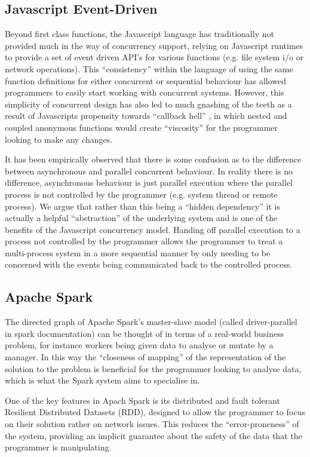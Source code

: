 \documentclass{sig-alternate}
\begin{document}
\subsection{Javascript Event-Driven}
Beyond first class functions, the Javascript language has
traditionally not provided much in the way of concurrency support,
relying on Javascript runtimes to provide a set of event driven API's
for various functions (e.g. file system i/o or network operations).
This ``consistency'' within the language of using the same function
definitions for either concurrent or sequential behaviour has allowed
programmers to easily start working with concurrent systems. However,
this simplicity of concurrent design has also led to much gnashing of
the teeth as a result of Javascripts propensity towards ``callback
hell'' \cite{Edwards:2009:CR:1639950.1640058}, in which nested and
coupled anonymous functions would create ``viscosity'' for the
programmer looking to make any changes.

It has been empirically observed that there is some confusion as to
the difference between asynchronous and parallel concurrent behaviour.
In reality there is no difference, asynchronous behaviour is just
parallel execution where the parallel process is not controlled by the
programmer (e.g. system thread or remote process). We argue that
rather than this being a ``hidden dependency'' it is actually a
helpful ``abstraction'' of the underlying system and is one of the
benefits of the Javascript concurrency model. Handing off parallel
execution to a process not controlled by the programmer allows the
programmer to treat a multi-process system in a more sequential manner
by only needing to be concerned with the events being communicated
back to the controlled process.

\subsection{Apache Spark}
The directed graph of Apache Spark's master-slave model (called
driver-parallel in spark documentation) can be thought of in terms of
a real-world business problem, for instance workers being given data
to analyse or mutate by a manager. In this way the ``closeness of
mapping'' of the representation of the solution to the problem is
beneficial for the programmer looking to analyse data, which is what
the Spark system aims to specialise in.

One of the key features in Apach Spark is its distributed and fault
tolerant Resilient Distributed Datasets (RDD), designed to allow the
programmer to focus on their solution rather on network issues. This
reduces the ``error-proneness'' of the system, providing an implicit
guarantee about the safety of the data that the programmer is
manipulating.
\end{document}
